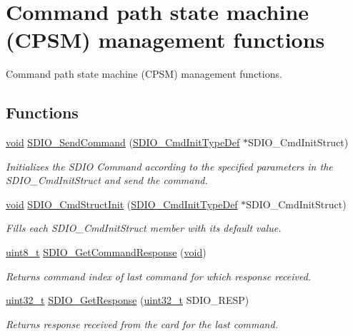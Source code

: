 \hypertarget{group___s_d_i_o___group2}{\section{Command path state machine (C\-P\-S\-M) management functions}
\label{group___s_d_i_o___group2}
}


Command path state machine (C\-P\-S\-M) management functions.  


\subsection*{Functions}
\begin{DoxyCompactItemize}
\item 
\hyperlink{group___n_a_m_e_ga18028b8badbf1ea7e704ccac3c488e82}{void} \hyperlink{group___s_d_i_o___group2_ga7117d2f702703f6c0a66bc07707cab23}{S\-D\-I\-O\-\_\-\-Send\-Command} (\hyperlink{struct_s_d_i_o___cmd_init_type_def}{S\-D\-I\-O\-\_\-\-Cmd\-Init\-Type\-Def} $\ast$S\-D\-I\-O\-\_\-\-Cmd\-Init\-Struct)
\begin{DoxyCompactList}\small\item\em Initializes the S\-D\-I\-O Command according to the specified parameters in the S\-D\-I\-O\-\_\-\-Cmd\-Init\-Struct and send the command. \end{DoxyCompactList}\item 
\hyperlink{group___n_a_m_e_ga18028b8badbf1ea7e704ccac3c488e82}{void} \hyperlink{group___s_d_i_o___group2_ga09d9e89f49c87c82aec79c97b7068e24}{S\-D\-I\-O\-\_\-\-Cmd\-Struct\-Init} (\hyperlink{struct_s_d_i_o___cmd_init_type_def}{S\-D\-I\-O\-\_\-\-Cmd\-Init\-Type\-Def} $\ast$S\-D\-I\-O\-\_\-\-Cmd\-Init\-Struct)
\begin{DoxyCompactList}\small\item\em Fills each S\-D\-I\-O\-\_\-\-Cmd\-Init\-Struct member with its default value. \end{DoxyCompactList}\item 
\hyperlink{stdint_8h_aba7bc1797add20fe3efdf37ced1182c5}{uint8\-\_\-t} \hyperlink{group___s_d_i_o___group2_ga9badf271c818e09da301d715c4ad0e5b}{S\-D\-I\-O\-\_\-\-Get\-Command\-Response} (\hyperlink{group___n_a_m_e_ga18028b8badbf1ea7e704ccac3c488e82}{void})
\begin{DoxyCompactList}\small\item\em Returns command index of last command for which response received. \end{DoxyCompactList}\item 
\hyperlink{stdint_8h_a435d1572bf3f880d55459d9805097f62}{uint32\-\_\-t} \hyperlink{group___s_d_i_o___group2_ga5c1e859511840e8cca6a9a768bce220b}{S\-D\-I\-O\-\_\-\-Get\-Response} (\hyperlink{stdint_8h_a435d1572bf3f880d55459d9805097f62}{uint32\-\_\-t} S\-D\-I\-O\-\_\-\-R\-E\-S\-P)
\begin{DoxyCompactList}\small\item\em Returns response received from the card for the last command. \end{DoxyCompactList}\end{DoxyCompactItemize}


